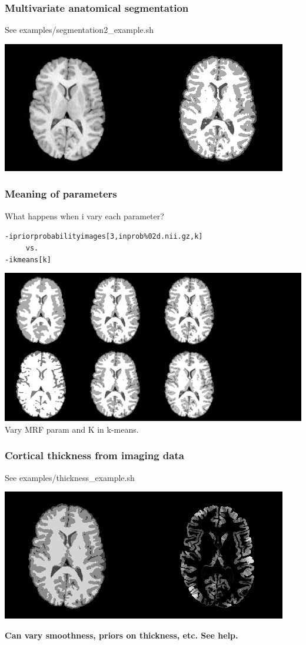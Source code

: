 \documentclass[18pt]{beamer}
\begin{document}
\begin{frame}
\frametitle{Multivariate anatomical segmentation}
See  examples/segmentation2\_example.sh

\begin{center}
\includegraphics[width=3.in]{../figures/r64sliceseg2.jpg}
\end{center}
 \end{frame}

\begin{frame}
\frametitle{Meaning of parameters}
What happens when i vary each parameter?
\begin{alltt}
-i priorprobabilityimages[3, inprob\%02d.nii.gz, k ]  \newline
~~~~~vs.  \newline
-i kmeans[ k ]
\end{alltt}
\begin{center}
\includegraphics[width=3.in]{../figures/r64segparams.jpg}\newline
Vary MRF param and K in k-means.
\end{center}
\end{frame}

\begin{frame}
\frametitle{Cortical thickness from imaging data}
See  examples/thickness\_example.sh

\begin{center}
\includegraphics[width=4.in]{../figures/r64thickness.jpg}
\end{center}
{\bf Can vary smoothness, priors on thickness, etc.  See help. }
\end{frame}
\end{document}

